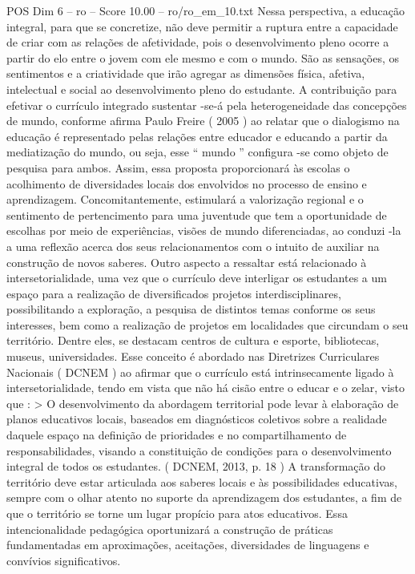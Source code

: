 \begin{textsample}{POS Dim 6 – ro – Score 10.00 – ro/ro\_em\_10.txt}
Nessa perspectiva, a educação integral, para que se concretize, não deve permitir a ruptura entre a capacidade de criar com as relações de afetividade, pois o desenvolvimento pleno ocorre a partir do elo entre o jovem com ele mesmo e com o mundo.
São as sensações, os sentimentos e a criatividade que irão agregar as dimensões física, afetiva, intelectual e social ao desenvolvimento pleno do estudante.
A contribuição para efetivar o currículo integrado sustentar -se-á pela heterogeneidade das concepções de mundo, conforme afirma Paulo Freire ( 2005 ) ao relatar que o dialogismo na educação é representado pelas relações entre educador e educando a partir da mediatização do mundo, ou seja, esse “ mundo ” configura -se como objeto de pesquisa para ambos.
Assim, essa proposta proporcionará às escolas o acolhimento de diversidades locais dos envolvidos no processo de ensino e aprendizagem.
Concomitantemente, estimulará a valorização regional e o sentimento de pertencimento para uma juventude que tem a oportunidade de escolhas por meio de experiências, visões de mundo diferenciadas, ao conduzi -la a uma reflexão acerca dos seus relacionamentos com o intuito de auxiliar na construção de novos saberes.
Outro aspecto a ressaltar está relacionado à intersetorialidade, uma vez que o currículo deve interligar os estudantes a um espaço para a realização de diversificados projetos interdisciplinares, possibilitando a exploração, a pesquisa de distintos temas conforme os seus interesses, bem como a realização de projetos em localidades que circundam o seu território.
Dentre eles, se destacam centros de cultura e esporte, bibliotecas, museus, universidades.
Esse conceito é abordado nas Diretrizes Curriculares Nacionais ( DCNEM ) ao afirmar que o currículo está intrinsecamente ligado à intersetorialidade, tendo em vista que não há cisão entre o educar e o zelar, visto que : > O desenvolvimento da abordagem territorial pode levar à elaboração de planos educativos locais, baseados em diagnósticos coletivos sobre a realidade daquele espaço na definição de prioridades e no compartilhamento de responsabilidades, visando a constituição de condições para o desenvolvimento integral de todos os estudantes. ( DCNEM, 2013, p. 18 ) A transformação do território deve estar articulada aos saberes locais e às possibilidades educativas, sempre com o olhar atento no suporte da aprendizagem dos estudantes, a fim de que o território se torne um lugar propício para atos educativos.
Essa intencionalidade pedagógica oportunizará a construção de práticas fundamentadas em aproximações, aceitações, diversidades de linguagens e convívios significativos.

\end{textsample}
